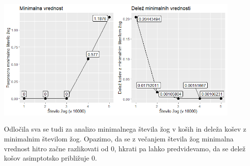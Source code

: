 \documentclass[a4paper, 11pt]{article}
\begin{document}
\includegraphics[width=12cm, height=6cm]{minimum.png}

Odločila sva se tudi za analizo minimalnega števila žog v koših in deleža košev z minimalnim številom žog.
Opazimo, da se z večanjem števila žog minimalna vrednost hitro začne razlikovati od 0, hkrati pa lahko predvidevamo, da se delež košov asimptotsko približuje $0$. 
\end{document}
